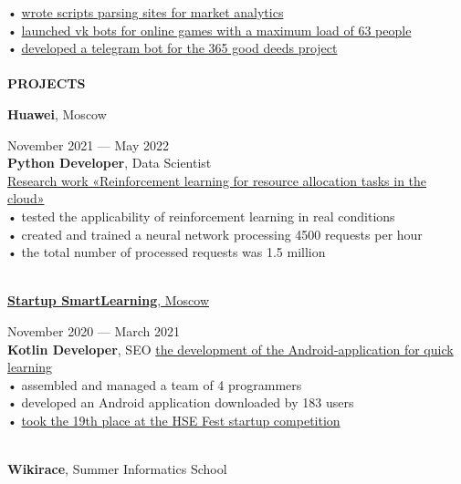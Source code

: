 \documentclass{article}
\begin{document}
\begin{vwcol}[widths={0.8,0.2},
 sep=.8cm, justify=flush,rule=0pt,indent=1em]
• \href{https://github.com/NikPeg/OzonParsing}{wrote scripts parsing sites for market analytics}\\
• \href{https://github.com/NikPeg/ExtraterrestrialBot}{launched vk bots for online games with a maximum load of 63 people}\\
• \href{https://github.com/NikPeg/dobrobot365}{developed a telegram bot for the 365 good deeds project}\\
\\
\noindent\textcolor[rgb]{0.1255,0.2902,0.7843}{\textbf{\Large{PROJECTS}}}\\
\begin{Large}
\textbf{Huawei}, Moscow
\end{Large}
\hspace{190pt}November 2021 — May 2022\\
\textbf{Python Developer}, Data Scientist\\
\href{https://github.com/NikPeg/Reinforcement-learning-for-resource-allocation-tasks-in-the-cloud}{Research work «Reinforcement learning for resource allocation tasks in the cloud»}\\
• tested the applicability of reinforcement learning in real conditions\\
• created and trained a neural network processing 4500 requests per hour\\
• the total number of processed requests was 1.5 million\\
\\
\begin{Large}
\href{https://www.canva.com/design/DAEaT9nPC7Y/y7_r2BzUEiUiFKW36oP-Pw/view?utm_content=DAEaT9nPC7Y&utm_campaign=designshare&utm_medium=link&utm_source=publishsharelink}{\textbf{Startup SmartLearning}, Moscow}
\end{Large}
\hspace{70pt}November 2020 — March 2021\\
\textbf{Kotlin Developer}, SEO \href{https://gitlab.com/peganov.nik/smartlearning}{the development of the Android-application for quick learning}\\
• assembled and managed a team of 4 programmers\\
• developed an Android application downloaded by 183 users\\
• \href{https://fest.hse.ru/top1002021}{took the 19th place at the HSE Fest startup competition}\\
\\
\begin{Large}
\textbf{Wikirace}, Summer Informatics School

\end{Large}
\end{vwcol}
\end{document}
